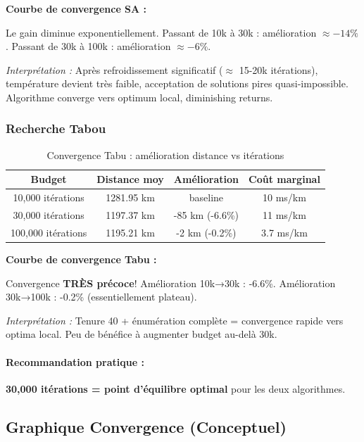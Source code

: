 \documentclass[12pt,a4paper,twoside]{report}
\begin{document}
\textbf{Courbe de convergence SA :}

Le gain diminue exponentiellement. Passant de 10k à 30k : amélioration $\approx
    -14\%$. Passant de 30k à 100k : amélioration $\approx -6\%$.

\textit{Interprétation :} Après refroidissement significatif ($\approx$ 15-20k itérations), température devient très faible, acceptation de solutions pires quasi-impossible. Algorithme converge vers optimum local, diminishing returns.

\subsubsection{Recherche Tabou}

\begin{table}[H]
    \centering
    \caption{Convergence Tabu : amélioration distance vs itérations}
    \begin{tabular}{|c|c|c|c|}
        \hline
        \textbf{Budget}    & \textbf{Distance moy} & \textbf{Amélioration} & \textbf{Coût marginal} \\
        \hline
        10,000 itérations  & 1281.95 km            & baseline              & 10 ms/km               \\
        30,000 itérations  & 1197.37 km            & -85 km (-6.6\%)       & 11 ms/km               \\
        100,000 itérations & 1195.21 km            & -2 km (-0.2\%)        & 3.7 ms/km              \\
        \hline
    \end{tabular}
\end{table}

\textbf{Courbe de convergence Tabu :}

Convergence \textbf{TRÈS précoce}! Amélioration 10k→30k : -6.6\%. Amélioration
30k→100k : -0.2\% (essentiellement plateau).

\textit{Interprétation :} Tenure 40 + énumération complète = convergence rapide vers optima local. Peu de bénéfice à augmenter budget au-delà 30k.

\paragraph{Recommandation pratique :} \textbf{30,000 itérations = point d'équilibre optimal} pour les deux algorithmes.

\subsection{Graphique Convergence (Conceptuel)}
\end{document}
